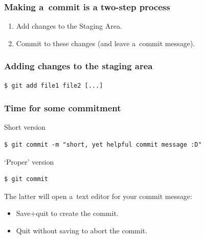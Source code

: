\documentclass[12pt]{beamer}
\begin{document}
\begin{frame}
  \frametitle{Making a~commit is a two-step process}

  \begin{enumerate}
    \item\alert{Add} changes to the Staging Area.
    \item\alert{Commit} to these changes (and leave a~commit message).
  \end{enumerate}
\end{frame}

\begin{frame}[fragile]
  \frametitle{Adding changes to the staging area}

  {\footnotesize{}%
    \begin{verbatim}
$ git add file1 file2 [...]
    \end{verbatim}%
  }
\end{frame}

\begin{frame}[fragile]
  \frametitle{Time for some commitment}

  \begin{block}{Short version}
    {\footnotesize{}%
      \begin{verbatim}
$ git commit -m "short, yet helpful commit message :D"
      \end{verbatim}%
    }
  \end{block}

  \begin{block}{`Proper' version}
    {\footnotesize{}%
      \begin{verbatim}
$ git commit
      \end{verbatim}%
    }
  \end{block}

  The latter will open a~text editor for your commit message:
  \begin{itemize}
    \item Save$+$quit to create the commit.
    \item Quit without saving to abort the commit.
  \end{itemize}
\end{frame}
\end{document}
